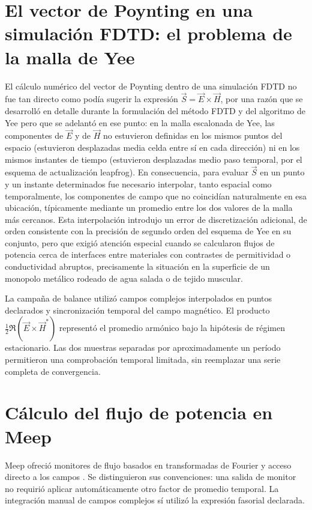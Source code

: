 \section{El vector de Poynting en una simulación FDTD: el problema de la malla de Yee}
El cálculo numérico del vector de Poynting dentro de una simulación FDTD no fue tan directo como podía sugerir la expresión $\vec{S}=\vec{E}\times\vec{H}$, por una razón que se desarrolló en detalle durante la formulación del método FDTD y del algoritmo de Yee pero que se adelantó en ese punto: en la malla escalonada de Yee, las componentes de $\vec{E}$ y de $\vec{H}$ no estuvieron definidas en los mismos puntos del espacio (estuvieron desplazadas media celda entre sí en cada dirección) ni en los mismos instantes de tiempo (estuvieron desplazadas medio paso temporal, por el esquema de actualización leapfrog). En consecuencia, para evaluar $\vec{S}$ en un punto y un instante determinados fue necesario interpolar, tanto espacial como temporalmente, los componentes de campo que no coincidían naturalmente en esa ubicación, típicamente mediante un promedio entre los dos valores de la malla más cercanos. Esta interpolación introdujo un error de discretización adicional, de orden consistente con la precisión de segundo orden del esquema de Yee en su conjunto, pero que exigió atención especial cuando se calcularon flujos de potencia cerca de interfaces entre materiales con contrastes de permitividad o conductividad abruptos, precisamente la situación en la superficie de un monopolo metálico rodeado de agua salada o de tejido muscular.

La campaña de balance utilizó campos complejos interpolados en puntos declarados y sincronización temporal del campo magnético. El producto $\frac12\Re(\vec E\times\vec H^*)$ representó el promedio armónico bajo la hipótesis de régimen estacionario. Las dos muestras separadas por aproximadamente un período permitieron una comprobación temporal limitada, sin reemplazar una serie completa de convergencia.

\section{Cálculo del flujo de potencia en Meep}
Meep ofreció monitores de flujo basados en transformadas de Fourier y acceso directo a los campos \citep{MeepUI,MeepBasics}. Se distinguieron sus convenciones: una salida de monitor no requirió aplicar automáticamente otro factor de promedio temporal. La integración manual de campos complejos sí utilizó la expresión fasorial declarada.

